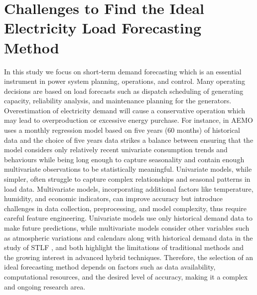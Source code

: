 \documentclass[mstat,12pt]{unswthesis}
\begin{document}
\section{Challenges to Find the Ideal Electricity Load Forecasting
Method}\label{challenges-to-find-the-ideal-electricity-load-forecasting-method}

In this study we focus on short-term demand forecasting which is an
essential instrument in power system planning, operations, and control.
Many operating decisions are based on load forecasts such as dispatch
scheduling of generating capacity, reliability analysis, and maintenance
planning for the generators. Overestimation of electricity demand will
cause a conservative operation which may lead to overproduction or
excessive energy purchase. For instance, in \cite{AEMO} AEMO uses a
monthly regression model based on five years (60 months) of historical
data and the choice of five years data strikes a balance between
ensuring that the model considers only relatively recent univariate
consumption trends and behaviours while being long enough to capture
seasonality and contain enough multivariate observations to be
statistically meaningful. Univariate models, while simpler, often
struggle to capture complex relationships and seasonal patterns in load
data. Multivariate models, incorporating additional factors like
temperature, humidity, and economic indicators, can improve accuracy but
introduce challenges in data collection, preprocessing, and model
complexity, thus require careful feature engineering. Univariate models
use only historical demand data to make future predictions, while
multivariate models consider other variables such as atmospheric
variations and calendars along with historical demand data in the study
of STLF \cite{asi6060100}, \cite{wang2016review} and
\cite{chen2015electricity} both highlight the limitations of traditional
methods and the growing interest in advanced hybrid techniques.
Therefore, the selection of an ideal forecasting method depends on
factors such as data availability, computational resources, and the
desired level of accuracy, making it a complex and ongoing research
area.
\end{document}
